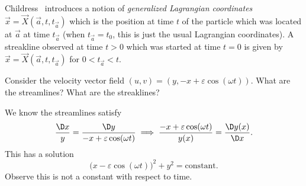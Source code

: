 \begin{node}[Kinematics]
\begin{node}[Streakline]
Childress~\cite[\S1.1.1]{childress2009introduction} introduces a notion
of \emph{generalized Lagrangian coordinates} $\vec{x}=\vec{X}(\vec{a},t,t_{\vec{a}})$
which is the position at time $t$ of the particle which was located at $\vec{a}$
at time $t_{\vec{a}}$ (when $t_{\vec{a}}=t_{0}$, this is just the usual
Lagrangian coordinates). A streakline observed at time $t>0$ which was
started at time $t=0$ is given by
$\vec{x}=\vec{X}(\vec{a},t,t_{\vec{a}})$ for $0<t_{\vec{a}}<t$.
\end{node}

\begin{example}\label{fluids:describing-000M}%
Consider the velocity vector field $(u,v)=(y,-x+\varepsilon\cos(\omega t))$.
What are the streamlines? What are the streaklines?

We know the streamlines satisfy
\begin{equation}
\frac{\D x}{y}=\frac{\D y}{-x+\varepsilon\cos(\omega t)}\implies\frac{-x+\varepsilon\cos(\omega t)}{y(x)}=\frac{\D y(x)}{\D x}.
\end{equation}
This has a solution
\begin{equation}
\bigl(x-\varepsilon\cos(\omega t)\bigr)^{2} + y^{2}=\mbox{constant}.
\end{equation}
Observe this is not a constant with respect to time.


\end{example}
\end{node}
